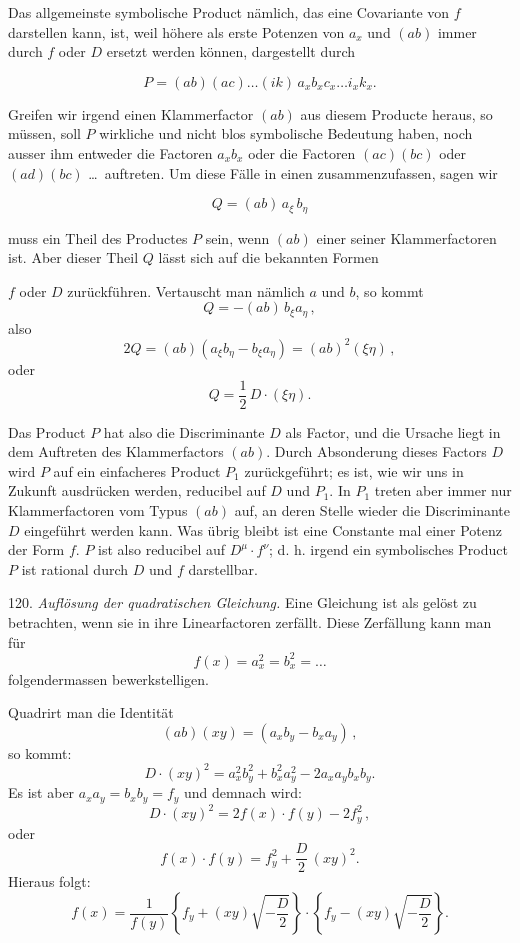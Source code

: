 \documentclass[11pt]{article}
\providecommand{\weberpage}[1]{}
\begin{document}
Das allgemeinste symbolische Product nämlich, das eine Covariante
von $f$ darstellen kann, ist, weil höhere als erste Potenzen von $a_x$ und
$(ab)$ immer durch $f$ oder $D$ ersetzt werden können, dargestellt durch

\[
P = (ab)(ac) \dots (ik)\,a_x b_x c_x \dots i_x k_x.
\]

Greifen wir irgend einen Klammerfactor $(ab)$ aus diesem Producte
heraus, so müssen, soll $P$ wirkliche und nicht blos symbolische Bedeutung
haben, noch ausser ihm entweder die Factoren $a_x b_x$ oder die Factoren
$(ac)(bc)$ oder $(ad)(bc)$ \dots\ auftreten. Um diese Fälle in einen
zusammenzufassen, sagen wir

\[
Q = (ab)\,a_\xi\,b_\eta
\]

muss ein Theil des Productes $P$ sein, wenn $(ab)$ einer seiner Klammerfactoren
ist. Aber dieser Theil $Q$ lässt sich auf die bekannten Formen


\weberpage{137}
$f$ oder $D$ zurückführen. Vertauscht man nämlich $a$ und $b$, so kommt
\[
Q = -(ab)\,b_\xi a_\eta\,,
\]
also
\[
2Q = (ab)(a_\xi b_\eta - b_\xi a_\eta) = (ab)^2(\xi\eta)\,,
\]
oder
\[
Q = \frac{1}{2}\,D\cdot(\xi\eta).
\]

Das Product $P$ hat also die Discriminante $D$ als Factor, und die Ursache liegt in dem Auftreten des Klammerfactors $(ab)$. Durch Absonderung dieses Factors $D$ wird $P$ auf ein einfacheres Product $P_1$ zurückgeführt; es ist, wie wir uns in Zukunft ausdrücken werden, reducibel auf $D$ und $P_1$. In $P_1$ treten aber immer nur Klammerfactoren vom Typus $(ab)$ auf, an deren Stelle wieder die Discriminante $D$ eingeführt werden kann. Was übrig bleibt ist eine Constante mal einer Potenz der Form $f$. $P$ ist also reducibel auf $D^\mu\cdot f^\nu$; d. h. irgend ein symbolisches Product $P$ ist rational durch $D$ und $f$ darstellbar.

120. \textit{Auflösung der quadratischen Gleichung.} Eine Gleichung ist als gelöst zu betrachten, wenn sie in ihre Linearfactoren zerfällt. Diese Zerfällung kann man für
\[
f(x) = a_x^2 = b_x^2 = \ldots
\]
folgendermassen bewerkstelligen.

Quadrirt man die Identität
\[
(ab)(xy) = (a_x b_y - b_x a_y)\,,
\]
so kommt:
\[
D\cdot(xy)^2 = a_x^2 b_y^2 + b_x^2 a_y^2 - 2a_x a_y b_x b_y.
\]
Es ist aber $a_x a_y = b_x b_y = f_y$ und demnach wird:
\[
D\cdot(xy)^2 = 2f(x)\cdot f(y) - 2f_y^2\,,
\]
oder
\[
f(x)\cdot f(y) = f_y^2 + \frac{D}{2}\,(xy)^2.
\]
Hieraus folgt:
\[
f(x) = \frac{1}{f(y)}\left\{f_y + (xy)\sqrt{-\frac{D}{2}}\right\}\cdot\left\{f_y - (xy)\sqrt{-\frac{D}{2}}\right\}.
\]
\end{document}
